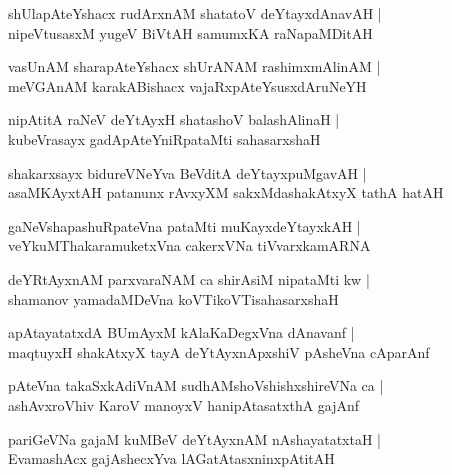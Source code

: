 \documentclass[twoside,12pt,openright]{book}
\newcounter{shloka}[chapter]
\begin{document}
\begin{shloka}%
shUlapAteYshacx rudArxnAM shatatoV deYtayxdAnavAH |\\
nipeVtusasxM yugeV BiVtAH samumxKA raNapaMDitAH 
\end{shloka}

\begin{shloka}%
vasUnAM sharapAteYshacx shUrANAM rashimxmAlinAM |\\
meVGAnAM karakABishacx vajaRxpAteYsusxdAruNeYH 
\end{shloka}

\begin{shloka}%
nipAtitA raNeV deYtAyxH shatashoV balashAlinaH |\\
kubeVrasayx gadApAteYniRpataMti sahasarxshaH 
\end{shloka}

\begin{shloka}%
shakarxsayx bidureVNeYva BeVditA deYtayxpuMgavAH |\\
asaMKAyxtAH patanunx rAvxyXM sakxMdashakAtxyX tathA hatAH 
\end{shloka}

\begin{shloka}%
gaNeVshapashuRpateVna pataMti muKayxdeYtayxkAH |\\
veYkuMThakaramuketxVna cakerxVNa tiVvarxkamARNA 
\end{shloka}

\begin{shloka}%
deYRtAyxnAM parxvaraNAM ca shirAsiM nipataMti kw |\\
shamanov yamadaMDeVna koVTikoVTisahasarxshaH 
\end{shloka}

\begin{shloka}%
apAtayatatxdA BUmAyxM kAlaKaDegxVna dAnavanf |\\
maqtuyxH shakAtxyX tayA deYtAyxnApxshiV pAsheVna cAparAnf 
\end{shloka}

\begin{shloka}%
pAteVna takaSxkAdiVnAM sudhAMshoVshishxshireVNa ca |\\
ashAvxroVhiv KaroV manoyxV hanipAtasatxthA gajAnf
\end{shloka}

\begin{shloka}%
pariGeVNa gajaM kuMBeV deYtAyxnAM nAshayatatxtaH |\\
EvamashAcx gajAshecxYva lAGatAtasxninxpAtitAH 
\end{shloka}
\end{document}
